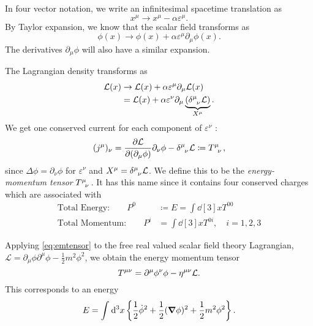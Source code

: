
\begin{example}
In four vector notation, we write an infinitesimal spacetime translation as 
\begin{equation}
  x^\mu \to x^\mu - \alpha \varepsilon^\mu.
\end{equation}
By Taylor expansion, we know that the scalar field transforms as
\begin{equation}
  \phi(x) \to \phi(x) + \alpha \varepsilon^\mu \partial_\mu \phi(x).
\end{equation}
The derivatives $\partial_\mu \phi$ will also have a similar expansion.

The Lagrangian density transforms as
\begin{align}
  \mathcal{L}(x) &\to \mathcal{L}(x) + \alpha \varepsilon^\mu \partial_\mu \mathcal{L}(x) \\
  &= \mathcal{L}(x) + \alpha \varepsilon^\nu \partial_\mu \underbrace{(\delta \indices{^\mu_\nu} \mathcal{L})}_{X^\mu}.
\end{align}
We get one conserved current for each component of $\varepsilon^\nu$ :
\begin{equation}
  \label{eq:emtensor}
  (j^\mu)_\nu = \pdv{\mathcal{L}}{(\partial_\mu \phi)} \partial_\nu \phi - \delta \indices{^\mu_\nu} \mathcal{L} \coloneqq T \indices{^{\mu}_{\nu}},
\end{equation}
since $\Delta \phi = \partial_\nu \phi$ for $ \varepsilon^\nu$ and $X^\mu = \delta \indices{^\mu_\nu} \mathcal{L}$.
  We define this to be the \emph{energy-momentum tensor} $T \indices{^\mu _\nu}$. It has this name since it contains four conserved charges which are associated with
  \begin{align}
    \text{Total Energy:} \qquad P^0 &\coloneqq E = \int \dd[3]{x} T^{00} \label{eq:total_energy} \\
    \text{Total Momentum:} \qquad P^{i} &= \int \dd[3]{x} T^{0i}, \quad i = 1,2,3 \label{eq:total_momentum}
  \end{align}

  Applying \eqref{eq:emtensor} to the free real valued scalar field theory Lagrangian, $\mathcal{L} =  \partial_\mu \phi \partial^\mu \phi - \frac{1}{2} m^2 \phi^2$,
  we obtain the energy momentum tensor
  \begin{equation}
    T \indices{^\mu^\nu} = \partial^\mu \phi ^\nu \phi - \eta\indices{^\mu^\nu} \mathcal{L}.
  \end{equation}
  This corresponds to an energy
  \begin{equation}
    E = \int_{}^{} \dd[3]{x}\left\{ \frac{1}{2} \dot \phi^2 + \frac{1}{2} (\grad \phi)^2 + \frac{1}{2} m^2 \phi^2 \right\}.
  \end{equation}
\end{example}

